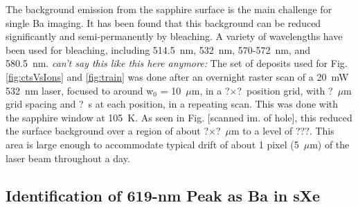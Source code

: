 \documentclass[aps,pra,reprint,superscriptaddress]{revtex4-1}
\begin{document}
The background emission from the sapphire surface is the main challenge for single Ba imaging.  It has been found that this background can be reduced significantly and semi-permanently by bleaching.  A variety of wavelengths have been used for bleaching, including 514.5~nm, 532~nm, 570-572~nm, and 580.5~nm.  \emph{\color{red}can't say this like this here anymore: }The set of deposits used for {\color{gray}Fig. \ref{fig:ctsVsIons} and \ref{fig:train}} was done after an overnight raster scan of a 20~mW 532~nm laser, focused to around w$_{0}$ = 10~$\mu$m, in a {\color{gray}?$\times$?}~position grid, with {\color{gray}?}~$\mu$m grid spacing and {\color{gray}?}~s at each position, in a repeating scan.  This was done with the sapphire window at 105~K.  As seen in Fig. [scanned im. of hole], this reduced the surface background over a region of about {\color{gray}?$\times$?}~$\mu$m to a level of ???.  This area is large enough to accommodate typical drift of about 1 pixel (5~$\mu$m) of the laser beam throughout a day.




\subsection{Identification of 619-nm Peak as Ba in sXe}
\end{document}
